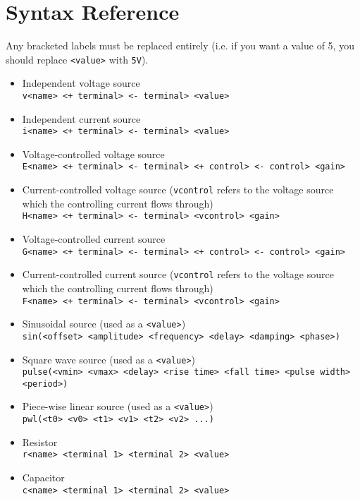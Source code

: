 \documentclass{article}
\begin{document}
\section{Syntax Reference}

Any bracketed labels must be replaced entirely (i.e. if you want a value of \unit{5}{\volt}, you should replace \verb|<value>| with \verb|5V|).

\begin{itemize}
	\item Independent voltage source \\ \verb|v<name> <+ terminal> <- terminal> <value>|
	\item Independent current source \\ \verb|i<name> <+ terminal> <- terminal> <value>|
	\item Voltage-controlled voltage source \\ \verb|E<name> <+ terminal> <- terminal> <+ control> <- control> <gain>|
	\item Current-controlled voltage source (\verb|vcontrol| refers to the voltage source which the controlling current flows through) \\ \verb|H<name> <+ terminal> <- terminal> <vcontrol> <gain>|
	\item Voltage-controlled current source  \\ \verb|G<name> <+ terminal> <- terminal> <+ control> <- control> <gain>|
	\item Current-controlled current source (\verb|vcontrol| refers to the voltage source which the controlling current flows through) \\ \verb|F<name> <+ terminal> <- terminal> <vcontrol> <gain>|
	\item Sinusoidal source (used as a \verb|<value>|) \\ \verb|sin(<offset> <amplitude> <frequency> <delay> <damping> <phase>)|
	\item Square wave source (used as a \verb|<value>|) \\ \verb|pulse(<vmin> <vmax> <delay> <rise time> <fall time> <pulse width> <period>)|
	\item Piece-wise linear source (used as a \verb|<value>|) \\ \verb|pwl(<t0> <v0> <t1> <v1> <t2> <v2> ...)|
	\item Resistor \\ \verb|r<name> <terminal 1> <terminal 2> <value>|
	\item Capacitor \\ \verb|c<name> <terminal 1> <terminal 2> <value>|

\end{itemize}
\end{document}
